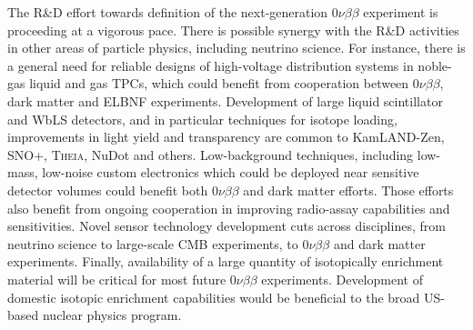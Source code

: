 The R\&D effort towards definition of the next-generation
$0\nu\beta\beta$ experiment is proceeding at a vigorous pace. There is
possible synergy with the R\&D activities in other areas of particle
physics, including neutrino science. For instance, there is a general
need for reliable designs of high-voltage distribution systems in
noble-gas liquid and gas TPCs, which could benefit from cooperation
between $0\nu\beta\beta$, dark matter and ELBNF
experiments. Development of large liquid scintillator and WbLS
detectors, and in particular techniques for isotope loading,
improvements in light yield and transparency are common to
KamLAND-Zen, SNO+, \textsc{Theia}, NuDot and others. Low-background techniques,
including low-mass, low-noise custom electronics which could be
deployed near sensitive detector volumes could benefit both
$0\nu\beta\beta$ and dark matter efforts. Those efforts also benefit
from ongoing cooperation in improving radio-assay capabilities and
sensitivities. Novel sensor technology development cuts across
disciplines, from neutrino science to large-scale CMB experiments, to
$0\nu\beta\beta$ and dark matter experiments. Finally, availability of
a large quantity of isotopically enrichment material will be critical
for most future $0\nu\beta\beta$ experiments. Development of 
domestic isotopic enrichment capabilities would be beneficial to the
broad US-based nuclear physics program.

